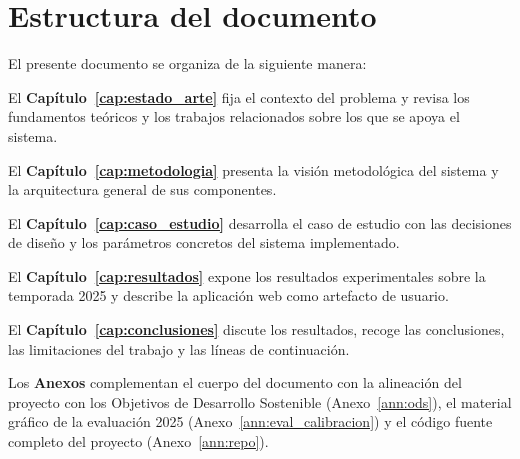 \section{Estructura del documento}
\label{sec:estructura}


El presente documento se organiza de la siguiente manera:

El \textbf{Capítulo~\ref{cap:estado_arte}} fija el contexto del problema y revisa los fundamentos teóricos y los trabajos relacionados sobre los que se apoya el sistema.

El \textbf{Capítulo~\ref{cap:metodologia}} presenta la visión metodológica del sistema y la arquitectura general de sus componentes.

El \textbf{Capítulo~\ref{cap:caso_estudio}} desarrolla el caso de estudio con las decisiones de diseño y los parámetros concretos del sistema implementado.

El \textbf{Capítulo~\ref{cap:resultados}} expone los resultados experimentales sobre la temporada 2025 y describe la aplicación web como artefacto de usuario.

El \textbf{Capítulo~\ref{cap:conclusiones}} discute los resultados, recoge las conclusiones, las limitaciones del trabajo y las líneas de continuación.

Los \textbf{Anexos} complementan el cuerpo del documento con la alineación del proyecto con los Objetivos de Desarrollo Sostenible (Anexo~\ref{ann:ods}), el material gráfico de la evaluación 2025 (Anexo~\ref{ann:eval_calibracion}) y el código fuente completo del proyecto (Anexo~\ref{ann:repo}).

